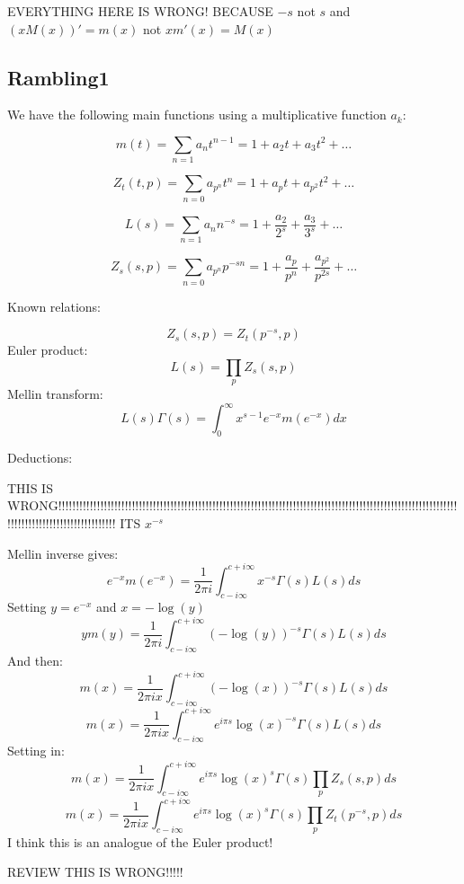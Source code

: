 \documentclass[a4paper]{amsart}
\begin{document}
EVERYTHING HERE IS WRONG! BECAUSE $-s$ not $s$ and $(xM(x))' = m(x)$ not $xm'(x) = M(x)$


\subsection{Rambling1}

We have the following main functions using a multiplicative function $a_k$:

$$m(t) = \sum_{n = 1} a_nt^{n - 1} = 1 + a_2t + a_3t^2 + \ldots$$

$$Z_t(t, p) = \sum_{n = 0} a_{p^n} t^n = 1 + a_pt + a_{p^2}t^2 + \ldots$$

$$L(s) = \sum_{n = 1} a_n n^{-s} = 1 + \frac{a_2}{2^s} + \frac{a_3}{3^s} + \ldots$$

$$Z_s(s, p) = \sum_{n = 0} a_{p^n} p^{-sn} = 1 + \frac{a_p}{p^n} + \frac{a_{p^2}}{p^{2s}} + \ldots$$

Known relations:

$$Z_s(s, p) = Z_t(p^{-s}, p)$$
Euler product:
$$L(s) = \prod_p Z_s(s, p)$$
Mellin transform:
$$L(s)\Gamma(s) = \int_0^{\infty} x^{s - 1} e^{-x} m(e^{-x})dx$$

Deductions:

THIS IS WRONG!!!!!!!!!!!!!!!!!!!!!!!!!!!!!!!!!!!!!!!!!!!!!!!!!!!!!!!!!!!!!!!!!!!!!!!!!!!!!!!!!!!!!!!!!!!!!!!!!!!!!!!!!!!!!!!!!!!!!!!!!!!!!!!!!!!!!!!!!!!!!!!!!
ITS $x^{-s}$


Mellin inverse gives:
$$e^{-x}m(e^{-x}) = \frac{1}{2\pi i}\int_{c - i\infty}^{c + i\infty}x^{-s} \Gamma(s)L(s)ds$$
Setting $y = e^{-x}$ and $x = -\log(y)$
$$y m(y) = \frac{1}{2\pi i}\int_{c - i\infty}^{c + i\infty}(-\log(y))^{-s} \Gamma(s)L(s)ds$$
And then:
$$m(x) = \frac{1}{2\pi i x} \int_{c - i\infty}^{c + i\infty}(-\log(x))^{-s} \Gamma(s)L(s)ds$$
$$m(x) = \frac{1}{2\pi i x} \int_{c - i\infty}^{c + i\infty}e^{i\pi s}\log(x)^{-s} \Gamma(s)L(s)ds$$
Setting in:
$$m(x) = \frac{1}{2\pi i x} \int_{c - i\infty}^{c + i\infty}e^{i\pi s}\log(x)^s \Gamma(s)\prod_p Z_s(s, p)ds$$
$$m(x) = \frac{1}{2\pi i x} \int_{c - i\infty}^{c + i\infty}e^{i\pi s}\log(x)^s \Gamma(s)\prod_p Z_t(p^{-s}, p)ds$$
I think this is an analogue of the Euler product!

REVIEW THIS IS WRONG!!!!! 
\end{document}
